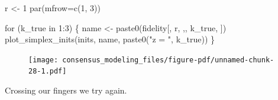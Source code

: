\documentclass[
  letterpaper,
  DIV=11,
  numbers=noendperiod]{scrartcl}
\newenvironment{Shaded}{\begin{snugshade}}{\end{snugshade}}
\newcommand{\AttributeTok}[1]{\textcolor[rgb]{0.40,0.45,0.13}{#1}}
\newcommand{\ControlFlowTok}[1]{\textcolor[rgb]{0.00,0.23,0.31}{#1}}
\newcommand{\DecValTok}[1]{\textcolor[rgb]{0.68,0.00,0.00}{#1}}
\newcommand{\FunctionTok}[1]{\textcolor[rgb]{0.28,0.35,0.67}{#1}}
\newcommand{\NormalTok}[1]{\textcolor[rgb]{0.00,0.23,0.31}{#1}}
\newcommand{\OtherTok}[1]{\textcolor[rgb]{0.00,0.23,0.31}{#1}}
\newcommand{\SpecialCharTok}[1]{\textcolor[rgb]{0.37,0.37,0.37}{#1}}
\newcommand{\StringTok}[1]{\textcolor[rgb]{0.13,0.47,0.30}{#1}}
\begin{document}
\begin{Shaded}
\begin{Highlighting}[]
\NormalTok{r }\OtherTok{\textless{}{-}} \DecValTok{1}
\FunctionTok{par}\NormalTok{(}\AttributeTok{mfrow=}\FunctionTok{c}\NormalTok{(}\DecValTok{1}\NormalTok{, }\DecValTok{3}\NormalTok{))}

\ControlFlowTok{for}\NormalTok{ (k\_true }\ControlFlowTok{in} \DecValTok{1}\SpecialCharTok{:}\DecValTok{3}\NormalTok{) \{}
\NormalTok{  name }\OtherTok{\textless{}{-}} \FunctionTok{paste0}\NormalTok{(}\StringTok{\textquotesingle{}fidelity[\textquotesingle{}}\NormalTok{, r, }\StringTok{\textquotesingle{},\textquotesingle{}}\NormalTok{, k\_true, }\StringTok{\textquotesingle{}]\textquotesingle{}}\NormalTok{)}
  \FunctionTok{plot\_simplex\_inits}\NormalTok{(inits, name, }\FunctionTok{paste0}\NormalTok{(}\StringTok{"z =  "}\NormalTok{, k\_true))}
\NormalTok{\}}
\end{Highlighting}
\end{Shaded}

\begin{figure}[H]

{\centering \texttt{[image: consensus\_modeling\_files/figure-pdf/unnamed-chunk-28-1.pdf]}

}

\end{figure}

Crossing our fingers we try again.
\end{document}
